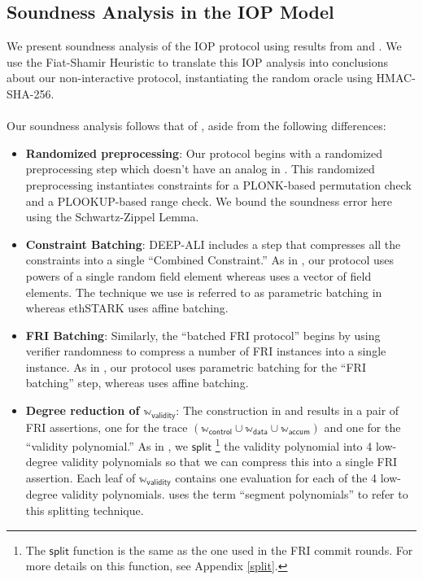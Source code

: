 \documentclass[10pt,letterpaper,titlepage]{article}
\theoremstyle{definition}
\begin{document}
\subsection{Soundness Analysis in the IOP Model}
\label{IOP soundness}
We present soundness analysis of the IOP protocol using results from \cite{proxGaps} and \cite{deepFRI}. 
We use the Fiat-Shamir Heuristic to translate this IOP analysis into conclusions about our non-interactive protocol, instantiating the random oracle using HMAC-SHA-256.\\
\\
Our soundness analysis follows that of \cite{ethSTARK}, aside from the following differences:
\begin{itemize}
  \item \textbf{Randomized preprocessing}: Our protocol begins with a randomized preprocessing step which doesn't have an analog in \cite{ethSTARK}. 
  This randomized preprocessing instantiates constraints for a PLONK-based permutation check and a PLOOKUP-based range check.
  We bound the soundness error here using the Schwartz-Zippel Lemma.
  \item \textbf{Constraint Batching}: DEEP-ALI includes a step that compresses all the constraints into a single ``Combined Constraint.'' 
  As in \cite{FRIsummary}, our protocol uses powers of a single random field element whereas \cite{ethSTARK} uses a vector of field elements. 
  The technique we use is referred to as parametric batching in \cite{proxGaps} whereas ethSTARK uses affine batching.
  \item \textbf{FRI Batching}: Similarly, the ``batched FRI protocol'' begins by using verifier randomness to compress a number of FRI instances into a single instance. As in \cite{FRIsummary}, our protocol uses parametric batching for the ``FRI batching'' step, whereas \cite{ethSTARK} uses affine batching. 
  \item \textbf{Degree reduction of $\mathbb{w}_\mathsf{validity}$}: The construction in \cite{stark} and \cite{ethSTARK} results in a pair of FRI assertions, one for the trace $(\mathbb{w}_\mathsf{control}\cup\mathbb{w}_\mathsf{data}\cup\mathbb{w}_\mathsf{accum})$ and one for the ``validity polynomial.'' As in \cite{FRIsummary}, we $\mathsf{split}$%
  \footnote{The $\mathsf{split}$ function is the same as the one used in the FRI commit rounds. For more details on this function, see Appendix \ref{split}.}
  the validity polynomial into 4 low-degree validity polynomials so that we can compress this into a single FRI assertion. Each leaf of $\mathbb{w}_\mathsf{validity}$ contains one evaluation for each of the 4 low-degree validity polynomials. \cite{FRIsummary} uses the term ``segment polynomials'' to refer to this splitting technique. 
\end{itemize}
\end{document}
